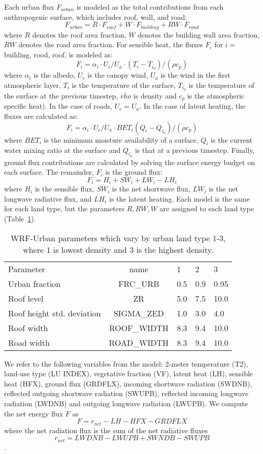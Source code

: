 \documentclass[draft,linenumbers]{agujournal}
\begin{document}
Each urban flux $F_{urban}$ is modeled as the total contributions from each anthropogenic surface, which includes roof, wall, and road: 
\[ F_{urban} = R\cdot F_{roof} + W\cdot F_{building} + RW\cdot F_{road} \]
where $R$ denotes the roof area fraction, $W$ denotes the building wall area fraction, $RW$ denotes the road area fraction. 
For sensible heat, the fluxes $F_i$ for $i=$building, rood, roof, is modeled as: 
\[F_i = \alpha_i\cdot U_c/U_a \cdot \left( T_i - T_{i_0}\right) / \left( \rho c_p \right ) \] 
where $\alpha_i $ is the albedo, $U_c$ is the canopy wind, $U_a$ is the wind in the first atmospheric layer, $T_i$ is the temperature of the surface, $T_{i_0}$ is the temperature of the surface at the previous timestep, $rho$ is density and $c_p$ is the atmospheric specific heat). In the case of roads, $U_c = U_a$.
In the case of latent heating, the fluxes are calculated as: 
\[F_i = \alpha_i \cdot U_c/U_a \cdot BET_i \left( Q_i - Q_{i_0}\right) / \left( \rho c_p \right ) \] 
where $BET_i$ is the minimum moisture availability of a surface, $Q_i$ is the current water mixing ratio at the surface and $Q_{i_0}$ is that at a previous timestep.
Finally, ground flux contributions are calculated by solving the surface energy budget on each surface. The remainder, $F_i$ is the ground flux: 
\[ F_i = H_i +SW_i + LW_i - LH_i\]
where $H_i$ is the sensible flux, $SW_i$ is the net shortwave flux, $LW_i$ is the net longwave radiative flux, and $LH_i$ is the latent heating. 
Each model is the same for each land type, but the parameters $R, RW, W$ are assigned to each land type (Table~\ref{tab:urban_model}). 

\begin{table}
\begin{tabular}{lclll}
Parameter & name & 1 & 2 & 3 \\
Urban fraction &  \textsc{FRC\_URB} & 0.5 & 0.9 & 0.95 \\
Roof level &\textsc{ZR} &5.0&  7.5 & 10.0 \\
Roof height std. deviation & \textsc{SIGMA\_ZED} & 1.0 &  3.0 &  4.0\\
Roof width &  \textsc{ROOF\_WIDTH} & 8.3& 9.4 & 10.0 \\
Road width & \textsc{ROAD\_WIDTH} &  8.3&  9.4&  10.0 
\end{tabular} 
\caption{WRF-Urban parameters which vary by urban land type 1-3, where 1 is lowest density and 3 is the highest density.}
\label{tab:urban_model}
\end{table}

We refer to the following variables from the model: 2-meter temperature (T2),
 land-use type (LU INDEX), vegetative fraction (VF),
 latent heat (LH), 
 sensible heat (HFX), ground flux (GRDFLX), 
incoming shortwave radiation (SWDNB),
reflected outgoing shortwave radiation (SWUPB), 
reflected incoming longwave radiation (LWDNB) and outgoing longwave radiation (LWUPB).  
We compute the net energy flux $F$ as
\begin{equation}
F= r_{net} -LH - HFX - GRDFLX
\end{equation}
where the net radiation flux is the sum of the net radiative fluxes $$r_{net}=LWDNB - LWUPB+ SWNDB-SWUPB$$.
\end{document}
